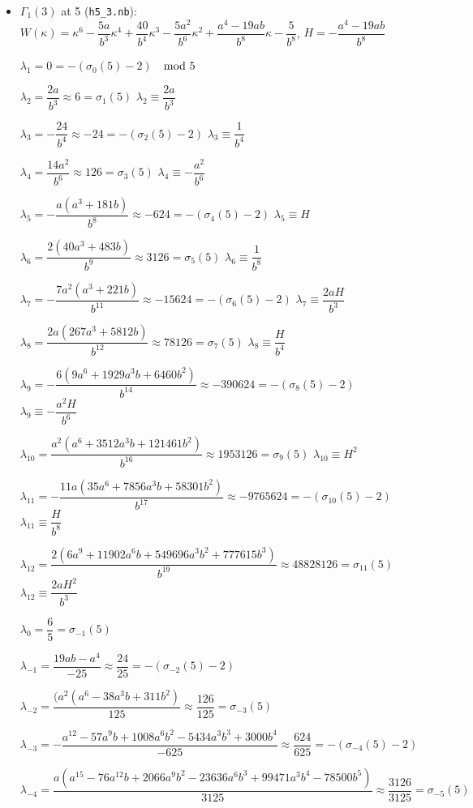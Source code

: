 \documentclass{rs}
\theoremstyle{definition}
\theoremstyle{remark}
\newcommand{\md}{~~{\rm mod}~}
\newcommand{\G}{\Gamma}
\newcommand{\K}{\kappa}
\renewcommand{\l}{\lambda}
\newcommand{\si}{\sigma}
\renewcommand{\=}{\approx}
\renewcommand{\-}{\sim}
\numberwithin{equation}{section}
\numberwithin{thm}{section}
\begin{document}
\begin{itemize}
 \item $\G_1(3)$ at 5 (\texttt{h5\_3.nb}): $W(\K) = \K^6 - \dfrac{5 a}{b^3} \K^4 + \dfrac{40}{b^4} \K^3 - \dfrac{5 a^2}{b^6} \K^2 + \dfrac{a^4 - 19 a b}{b^8} \K - \dfrac{5}{b^8}$, 
 \quad $H = -\dfrac{a^4 - 19 a b}{b^8}$ 

 $\l_1 = 0 = -(\si_0(5) - 2)$ \hfill $\md 5$

 $\l_2 = \dfrac{2 a}{b^3} \= 6 = \si_1(5)$ \hfill $\l_2 \equiv \dfrac{2 a}{b^3}$ 

 $\l_3 = -\dfrac{24}{b^4} \= -24 = -(\si_2(5) - 2)$ \hfill $\l_3 \equiv \dfrac{1}{b^4}$ 

 $\l_4 = \dfrac{14 a^2}{b^6} \= 126 = \si_3(5)$ \hfill $\l_4 \equiv -\dfrac{a^2}{b^6}$ 

 $\l_5 = -\dfrac{a (a^3 + 181 b)}{b^8} \= -624 = -(\si_4(5) - 2)$ \hfill $\l_5 \equiv H$ 

 $\l_6 = \dfrac{2 (40 a^3 + 483 b)}{b^9} \= 3126 = \si_5(5)$ \hfill $\l_6 \equiv \dfrac{1}{b^8}$ 

 $\l_7 = -\dfrac{7 a^2 (a^3 + 221 b)}{b^{11}} \= -15624 = -(\si_6(5) - 2)$ \hfill $\l_7 \equiv \dfrac{2 a H}{b^3}$ 

 $\l_8 = \dfrac{2 a (267 a^3 + 5812 b)}{b^{12}} \= 78126 = \si_7(5)$ \hfill $\l_8 \equiv \dfrac{H}{b^4}$ 

 $\l_9 = -\dfrac{6 (9 a^6 + 1929 a^3 b + 6460 b^2)}{b^{14}} \= -390624 = -(\si_8(5) - 2)$ \hfill $\l_9 \equiv -\dfrac{a^2 H}{b^6}$ 

 $\l_{10} = \dfrac{a^2 (a^6 + 3512 a^3 b + 121461 b^2)}{b^{16}} \= 1953126 = \si_9(5)$ \hfill $\l_{10} \equiv H^2$ 

 $\l_{11} = -\dfrac{11 a (35 a^6 + 7856 a^3 b + 58301 b^2)}{b^{17}} \= -9765624 = -(\si_{10}(5) - 2)$ \hfill $\l_{11} \equiv \dfrac{H}{b^8}$ 

 $\l_{12} = \dfrac{2 (6 a^9 + 11902 a^6 b + 549696 a^3 b^2 + 777615 b^3)}{b^{19}} \= 48828126 = \si_{11}(5)$ \hfill $\l_{12} \equiv \dfrac{2 a H^2}{b^3}$ 

 $\l_0 = \dfrac{6}{5} = \si_{-1}(5)$ 

 $\l_{-1} = \dfrac{19 a b - a^4}{-25} \= \dfrac{24}{25} = -(\si_{-2}(5) - 2)$ 

 $\l_{-2} = \dfrac{(a^2 (a^6 - 38 a^3 b + 311 b^2)}{125} \= \dfrac{126}{125} = \si_{-3}(5)$ 

 $\l_{-3} = -\dfrac{a^{12} - 57 a^9 b + 1008 a^6 b^2 - 5434 a^3 b^3 + 3000 b^4}{-625} \= \dfrac{624}{625} = -(\si_{-4}(5) - 2)$ 

 $\l_{-4} = \dfrac{a (a^{15} - 76 a^{12} b + 2066 a^9 b^2 - 23636 a^6 b^3 + 99471 a^3 b^4 - 78500 b^5)}{3125} \= \dfrac{3126}{3125} = \si_{-5}(5)$ 


\end{itemize}
\end{document}
